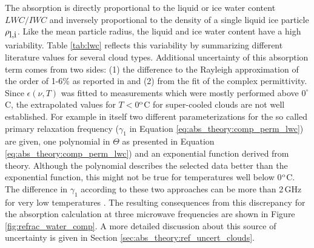 %
The absorption is directly proportional to the liquid or ice water
content $LWC/IWC$ and inversely proportional to the density of a
single liquid ice particle $\rho_{\mbox{\rm l,i}}$. Like the mean particle radius,
the liquid and ice water content have a high variability. Table
\ref{tab:lwc} reflects this variability by summarizing different
literature values for several cloud types. Additional uncertainty 
of this absorption term comes from two sides: 
(1) the difference to the Rayleigh approximation
of the order of 1-6\% as reported in \citet{lietal:97} and (2) from
the fit of the complex permittivity.  Since $\epsilon(\nu,T)$ was
fitted to measurements which were mostly performed above $0^\circ$C,
the extrapolated values for $T<$0$^{\rm o}$C for super-cooled
clouds are not well established. For example in \citet{liebeetal:91} 
itself two different parameterizations for the so called primary 
relaxation frequency ($\gamma_1$ in Equation \ref{eq:abs_theory:comp_perm_lwc}) 
are given, one polynomial in $\Theta$ as presented in 
Equation \ref{eq:abs_theory:comp_perm_lwc}) and an exponential function derived
from theory. Although the polynomial describes the selected 
data better than the exponential function, this might not be true for
temperatures well below 0$^{\rm o}$C.
The difference in $\gamma_1$ according to these two approaches can 
be more than 2\,GHz for very low temperatures \citep{liptonetal:99}. 
The resulting consequences from this discrepancy for the absorption 
calculation at three microwave frequencies are shown in 
Figure \ref{fig:refrac_water_comp}. A more detailed
discussion about this source of uncertainty is given in Section
\ref{sec:abs_theory:ref_uncert_clouds}.


